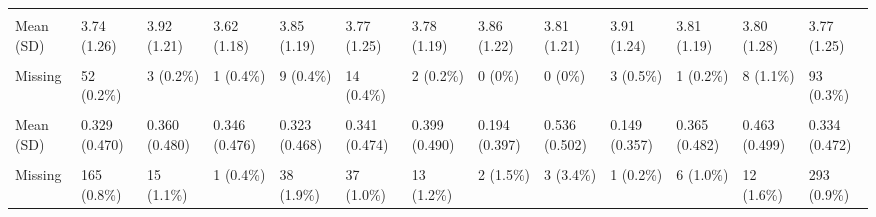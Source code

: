 \documentclass[
  single column]{article}
\begin{document}
\begin{landscape}
\begin{longtable}[t]{lllllllllllll}
\cellcolor{gray!10}{Extraversion (Personality Trait)} & \cellcolor{gray!10}{} & \cellcolor{gray!10}{} & \cellcolor{gray!10}{} & \cellcolor{gray!10}{} & \cellcolor{gray!10}{} & \cellcolor{gray!10}{} & \cellcolor{gray!10}{} & \cellcolor{gray!10}{} & \cellcolor{gray!10}{} & \cellcolor{gray!10}{} & \cellcolor{gray!10}{} & \cellcolor{gray!10}{}\\
Mean (SD) & 3.74 (1.26) & 3.92 (1.21) & 3.62 (1.18) & 3.85 (1.19) & 3.77 (1.25) & 3.78 (1.19) & 3.86 (1.22) & 3.81 (1.21) & 3.91 (1.24) & 3.81 (1.19) & 3.80 (1.28) & 3.77 (1.25)\\
\cellcolor{gray!10}{Median [Min, Max]} & \cellcolor{gray!10}{3.75 [1.00, 7.00]} & \cellcolor{gray!10}{4.00 [1.00, 7.00]} & \cellcolor{gray!10}{3.67 [1.00, 7.00]} & \cellcolor{gray!10}{4.00 [1.00, 7.00]} & \cellcolor{gray!10}{3.75 [1.00, 7.00]} & \cellcolor{gray!10}{3.75 [1.00, 7.00]} & \cellcolor{gray!10}{4.00 [1.50, 7.00]} & \cellcolor{gray!10}{3.75 [1.00, 6.25]} & \cellcolor{gray!10}{4.00 [1.00, 7.00]} & \cellcolor{gray!10}{3.75 [1.00, 7.00]} & \cellcolor{gray!10}{3.75 [1.00, 7.00]} & \cellcolor{gray!10}{3.75 [1.00, 7.00]}\\
Missing & 52 (0.2\%) & 3 (0.2\%) & 1 (0.4\%) & 9 (0.4\%) & 14 (0.4\%) & 2 (0.2\%) & 0 (0\%) & 0 (0\%) & 3 (0.5\%) & 1 (0.2\%) & 8 (1.1\%) & 93 (0.3\%)\\
\addlinespace
\cellcolor{gray!10}{Health Disability Status (Yes/No)} & \cellcolor{gray!10}{} & \cellcolor{gray!10}{} & \cellcolor{gray!10}{} & \cellcolor{gray!10}{} & \cellcolor{gray!10}{} & \cellcolor{gray!10}{} & \cellcolor{gray!10}{} & \cellcolor{gray!10}{} & \cellcolor{gray!10}{} & \cellcolor{gray!10}{} & \cellcolor{gray!10}{} & \cellcolor{gray!10}{}\\
Mean (SD) & 0.329 (0.470) & 0.360 (0.480) & 0.346 (0.476) & 0.323 (0.468) & 0.341 (0.474) & 0.399 (0.490) & 0.194 (0.397) & 0.536 (0.502) & 0.149 (0.357) & 0.365 (0.482) & 0.463 (0.499) & 0.334 (0.472)\\
\cellcolor{gray!10}{Median [Min, Max]} & \cellcolor{gray!10}{0 [0, 1.00]} & \cellcolor{gray!10}{0 [0, 1.00]} & \cellcolor{gray!10}{0 [0, 1.00]} & \cellcolor{gray!10}{0 [0, 1.00]} & \cellcolor{gray!10}{0 [0, 1.00]} & \cellcolor{gray!10}{0 [0, 1.00]} & \cellcolor{gray!10}{0 [0, 1.00]} & \cellcolor{gray!10}{1.00 [0, 1.00]} & \cellcolor{gray!10}{0 [0, 1.00]} & \cellcolor{gray!10}{0 [0, 1.00]} & \cellcolor{gray!10}{0 [0, 1.00]} & \cellcolor{gray!10}{0 [0, 1.00]}\\
Missing & 165 (0.8\%) & 15 (1.1\%) & 1 (0.4\%) & 38 (1.9\%) & 37 (1.0\%) & 13 (1.2\%) & 2 (1.5\%) & 3 (3.4\%) & 1 (0.2\%) & 6 (1.0\%) & 12 (1.6\%) & 293 (0.9\%)\\

\end{longtable}
\end{landscape}
\end{document}
